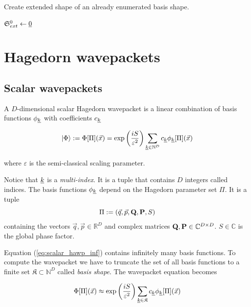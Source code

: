 \documentclass{article}
\begin{document}
\begin{algorithm}[H]
  \caption{Create extended shape of an already enumerated basis shape.}
  \(\mathfrak{S}_{ext}^0 \leftarrow \underline{0}\)\;
\end{algorithm}

\section{Hagedorn wavepackets}
\subsection{Scalar wavepackets}
A \(D\)-dimensional scalar Hagedorn wavepacket is a linear combination of basis functions \(\phi_{\underline{k}}\)
with coefficients \(c_{\underline{k}}\)

\begin{equation}
  \label{eq:scalar_hawp_inf}
  \ket{\Phi} := \Phi[\Pi](\vec{x}) = \exp{\left(\frac{iS}{\varepsilon^2}\right)}
  \sum_{\underline{k} \in \mathbb{N}^D} c_{\underline{k}}\phi_{\underline{k}}[\Pi](\vec{x})
\end{equation}

where \(\varepsilon\) is the semi-classical scaling parameter.\par
Notice that \(\underline{k}\) is a \emph{multi-index}. It is a tuple that
contains \(D\) integers called indices.
The basis functions \(\phi_{\underline{k}}\) depend on the
Hagedorn parameter set \(\Pi\). It is a tuple
\[
  \Pi := \left(\vec{q},\vec{p},\mathbf{Q},\mathbf{P},S\right)
\]
containing the vectors \( \vec{q},\vec{p} \in \mathbb{R}^D \) and
complex matrices \( \mathbf{Q},\mathbf{P} \in \mathbb{C}^{D \times D} \). \(S\in \mathbb{C}\) is
the global phase factor.

Equation (\ref{eq:scalar_hawp_inf}) contains infinitely many basis functions.
To compute the wave\-packet we have to truncate the set of all basis functions to
a finite set \(\mathfrak{K} \subset \mathbb{N}^D\) called \emph{basis shape}.
The wavepacket equation becomes

\[
  \Phi[\Pi](\vec{x}) \approx \exp{\left(\frac{iS}{\varepsilon^2}\right)}
  \sum_{\underline{k} \in \mathfrak{K}}c_{\underline{k}}\phi_{\underline{k}}[\Pi](\vec{x})
\]
\end{document}
